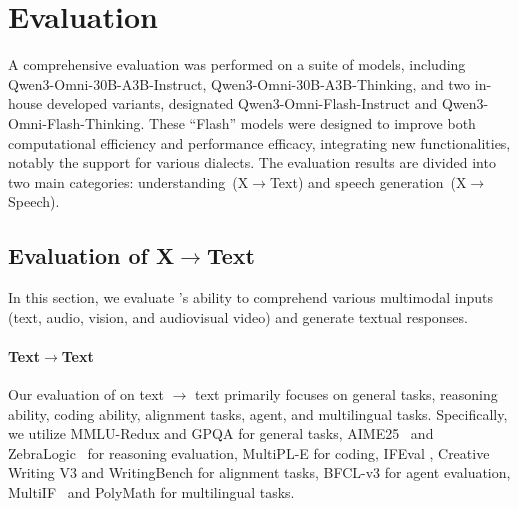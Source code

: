 



\section{Evaluation}
\label{sec:experiment}
A comprehensive evaluation was performed on a suite of models, including Qwen3-Omni-30B-A3B-Instruct, Qwen3-Omni-30B-A3B-Thinking, and two in-house developed variants, designated Qwen3-Omni-Flash-Instruct and Qwen3-Omni-Flash-Thinking. These ``Flash'' models were designed to improve both computational efficiency and performance efficacy, integrating new functionalities, notably the support for various dialects.
The evaluation results are divided into two main categories: understanding~(X$\to$Text) and speech generation~(X$\to$Speech). 

\subsection{Evaluation of X$\to$Text}
In this section, we evaluate \method's ability to comprehend various multimodal inputs (text, audio, vision, and audiovisual video) and generate textual responses.

\paragraph{Text$\to$Text} Our evaluation of \method on text $\to$ text primarily focuses on general tasks, reasoning ability, coding ability, alignment tasks, agent, and multilingual tasks. 
Specifically, we utilize MMLU-Redux \citep{mmluredux} and GPQA \citep{gpqa} for general tasks, AIME25~\citep{aime} and ZebraLogic~\citep{zebralogic} for reasoning evaluation, 
MultiPL-E \citep{multiple} for coding, IFEval \citep{ifeval}, Creative Writing V3 \citep{creative_writing} and WritingBench \citep{writingbench} for alignment tasks, 
BFCL-v3 \citep{bfcl} for agent evaluation, 
MultiIF~\citep{multiif} and PolyMath \citep{polymath} for multilingual tasks.

